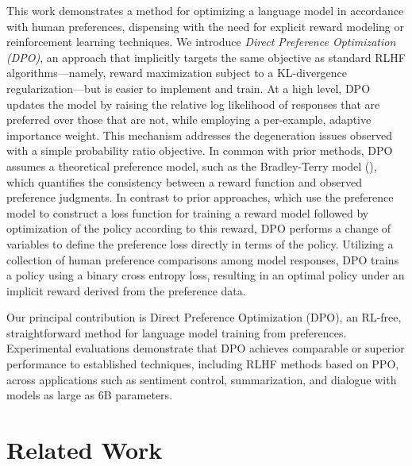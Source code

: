 This work demonstrates a method for optimizing a language model in accordance with human preferences, dispensing with the need for explicit reward modeling or reinforcement learning techniques. We introduce \textit{{Direct Preference Optimization} (DPO)}, an approach that implicitly targets the same objective as standard RLHF algorithms—namely, reward maximization subject to a KL-divergence regularization—but is easier to implement and train. At a high level, DPO updates the model by raising the relative log likelihood of responses that are preferred over those that are not, while employing a per-example, adaptive importance weight. This mechanism addresses the degeneration issues observed with a simple probability ratio objective. In common with prior methods, DPO assumes a theoretical preference model, such as the Bradley-Terry model (\cite{bradley1952rankanalysis}), which quantifies the consistency between a reward function and observed preference judgments. In contrast to prior approaches, which use the preference model to construct a loss function for training a reward model followed by optimization of the policy according to this reward, DPO performs a change of variables to define the preference loss directly in terms of the policy. Utilizing a collection of human preference comparisons among model responses, DPO trains a policy using a binary cross entropy loss, resulting in an optimal policy under an implicit reward derived from the preference data.

Our principal contribution is Direct Preference Optimization (DPO), an RL-free, straightforward method for language model training from preferences. Experimental evaluations demonstrate that DPO achieves comparable or superior performance to established techniques, including RLHF methods based on PPO, across applications such as sentiment control, summarization, and dialogue with models as large as 6B parameters.

\section{Related Work}

